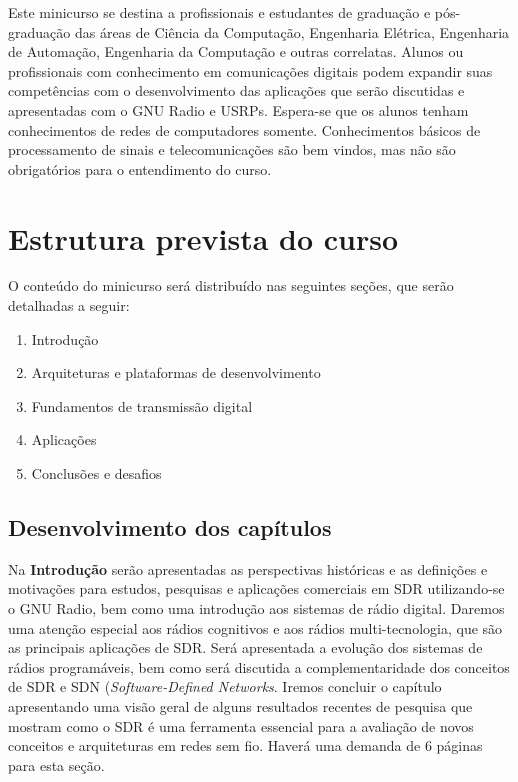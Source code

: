 \documentclass{SBCbookchapter}
\begin{document}
Este minicurso se destina a profissionais e estudantes de graduação e pós-graduação das áreas de Ciência da Computação, Engenharia Elétrica, Engenharia de Automação, Engenharia da Computação e outras correlatas. Alunos ou profissionais com conhecimento em comunicações digitais podem expandir suas competências com o desenvolvimento das aplicações que serão discutidas e apresentadas com o GNU Radio e USRPs. Espera-se que os alunos tenham conhecimentos de redes de computadores somente. Conhecimentos básicos de processamento de sinais e telecomunicações são bem vindos, mas não são obrigatórios para o entendimento do curso.


\section{Estrutura prevista do curso}

O conteúdo do minicurso será distribuído nas seguintes seções, que serão detalhadas a seguir:

\begin{enumerate}
    \item Introdução
    \item Arquiteturas e plataformas de desenvolvimento
    \item Fundamentos de transmissão digital
    \item Aplicações %
    \item Conclusões e desafios
\end{enumerate}


\subsection{Desenvolvimento dos capítulos}

Na \textbf{Introdução} serão apresentadas as perspectivas históricas e as definições e motivações para estudos, pesquisas e aplicações comerciais em SDR utilizando-se o GNU Radio, bem como uma introdução aos sistemas de rádio digital. Daremos uma atenção especial aos rádios cognitivos e aos rádios multi-tecnologia, que são as principais aplicações de SDR. Será apresentada a evolução dos sistemas de rádios programáveis, bem como será discutida a complementaridade dos conceitos de SDR e SDN ({\it Software-Defined Networks}. Iremos concluir o capítulo apresentando uma visão geral de alguns resultados recentes de pesquisa que mostram como o SDR é uma ferramenta essencial para a avaliação de novos conceitos e arquiteturas em redes sem fio. Haverá uma demanda de 6 páginas para esta seção.
\end{document}
